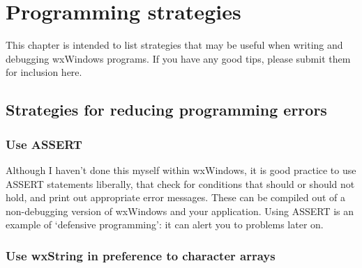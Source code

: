 \begin{comment}
See the separate manual and the directory utils/wxgraph. 

\section{Colours}\label{coloursampler}

A colour sampler for viewing colours and their names on each
platform.

%
\chapter{Tutorial}\label{tutorial}
\setheader{{\it CHAPTER \thechapter}}{}{}{}{}{{\it CHAPTER \thechapter}}%
\setfooter{\thepage}{}{}{}{}{\thepage}%

To be written.
\end{comment}

\chapter{Programming strategies}\label{strategies}
%
\setfooter{\thepage}{}{}{}{}{\thepage}%

This chapter is intended to list strategies that may be useful when
writing and debugging wxWindows programs. If you have any good tips,
please submit them for inclusion here.

\section{Strategies for reducing programming errors}

\subsection{Use ASSERT}

Although I haven't done this myself within wxWindows, it is good
practice to use ASSERT statements liberally, that check for conditions that
should or should not hold, and print out appropriate error messages.
These can be compiled out of a non-debugging version of wxWindows
and your application. Using ASSERT is an example of `defensive programming':
it can alert you to problems later on.

\subsection{Use wxString in preference to character arrays}

